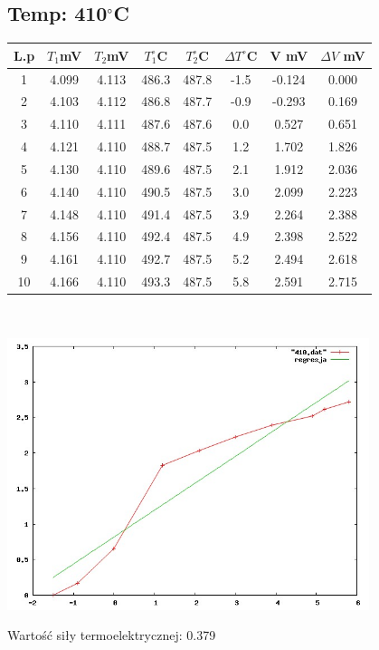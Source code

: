 \documentclass[a4paper,12pt]{article}
\begin{document}
\subsection{Temp: 410$^\circ$C}
\begin{tabular}{|c|c|c|c|c|c|c|c|}
\hline
L.p&$T_1$mV&$T_2$mV&$T_1^\circ$C&$T_2^\circ$C&$\Delta T^\circ$C&V mV&$\Delta V$ mV\\
\hline
1&4.099&4.113&486.3&487.8&-1.5&-0.124&0.000\\
2&4.103&4.112&486.8&487.7&-0.9&-0.293&0.169\\
3&4.110&4.111&487.6&487.6& 0.0& 0.527&0.651\\
4&4.121&4.110&488.7&487.5& 1.2& 1.702&1.826\\
5&4.130&4.110&489.6&487.5& 2.1& 1.912&2.036\\
6&4.140&4.110&490.5&487.5& 3.0& 2.099&2.223\\
7&4.148&4.110&491.4&487.5& 3.9& 2.264&2.388\\
8&4.156&4.110&492.4&487.5& 4.9& 2.398&2.522\\
9&4.161&4.110&492.7&487.5& 5.2& 2.494&2.618\\
10&4.166&4.110&493.3&487.5&5.8& 2.591&2.715\\
\hline
\end{tabular}\\
\begin{center}
\includegraphics[width=400px]{410}
\end{center}

Wartość siły termoelektrycznej: 0.379
\end{document}
